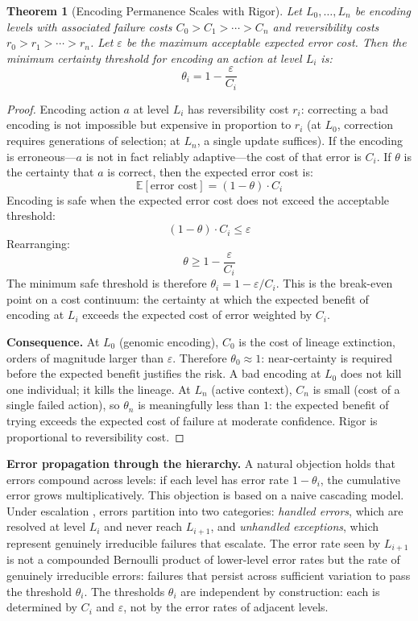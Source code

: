 \documentclass[11pt]{article}
\newtheorem{theorem}{Theorem}
\theoremstyle{definition}
\begin{document}
\begin{theorem}[Encoding Permanence Scales with Rigor]
\label{thm:encoding}
Let $L_0, \ldots, L_n$ be encoding levels with associated failure
costs $C_0 > C_1 > \cdots > C_n$ and reversibility costs
$r_0 > r_1 > \cdots > r_n$. Let $\varepsilon$ be the maximum
acceptable expected error cost. Then the minimum certainty threshold
for encoding an action at level $L_i$ is:
\[
\theta_i = 1 - \frac{\varepsilon}{C_i}
\]
\end{theorem}

\begin{proof}
Encoding action $a$ at level $L_i$ has reversibility cost $r_i$:
correcting a bad encoding is not impossible but expensive in proportion
to $r_i$ (at $L_0$, correction requires generations of selection; at
$L_n$, a single update suffices). If the encoding is erroneous---$a$
is not in fact reliably adaptive---the cost of that error is $C_i$. If
$\theta$ is the certainty that $a$ is correct, then the expected error
cost is:
\[
\mathbb{E}[\text{error cost}] = (1 - \theta) \cdot C_i
\]
Encoding is safe when the expected error cost does not exceed the
acceptable threshold:
\[
(1 - \theta) \cdot C_i \leq \varepsilon
\]
Rearranging:
\[
\theta \geq 1 - \frac{\varepsilon}{C_i}
\]
The minimum safe threshold is therefore $\theta_i = 1 -
\varepsilon / C_i$. This is the break-even point on a cost continuum:
the certainty at which the expected benefit of encoding at $L_i$
exceeds the expected cost of error weighted by $C_i$.

\textbf{Consequence.} At $L_0$ (genomic encoding), $C_0$ is the cost
of lineage extinction, orders of magnitude larger than $\varepsilon$.
Therefore $\theta_0 \approx 1$: near-certainty is required before the
expected benefit justifies the risk. A bad encoding at $L_0$ does not
kill one individual; it kills the lineage.
At $L_n$ (active context), $C_n$ is small (cost of a single failed
action), so $\theta_n$ is meaningfully less than $1$: the expected
benefit of trying exceeds the expected cost of failure at moderate
confidence. Rigor is proportional to reversibility cost.
\end{proof}

\textbf{Error propagation through the hierarchy.} A natural objection
holds that errors compound across levels: if each level has error rate
$1 - \theta_i$, the cumulative error grows multiplicatively. This
objection is based on a naive cascading model. Under escalation
\cite{McCarthy2026b}, errors partition into two categories:
\emph{handled errors}, which are resolved at level $L_i$ and never
reach $L_{i+1}$, and \emph{unhandled exceptions}, which represent
genuinely irreducible failures that escalate. The error rate seen by
$L_{i+1}$ is not a compounded Bernoulli product of lower-level error
rates but the rate of genuinely irreducible errors: failures that
persist across sufficient variation to pass the threshold $\theta_i$.
The thresholds $\theta_i$ are independent by construction: each is
determined by $C_i$ and $\varepsilon$, not by the error rates of
adjacent levels.
\end{document}
